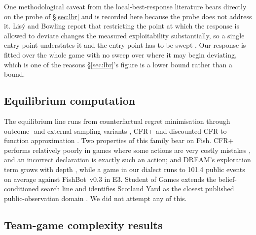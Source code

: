 \documentclass[11pt]{article}
\theoremstyle{definition}
\DeclareRobustCommand{\vthree}{\texorpdfstring{\mbox{FishBot v0.3}}{FishBot v0.3}}
\newcommand{\numEventsPerGame}{101.4}
\begin{document}
One methodological caveat from the local-best-response literature bears directly
on the probe of \S\ref{sec:lbr} and is recorded here because the probe does not
address it. Lis\'y and Bowling report that restricting the point at which the
response is allowed to deviate changes the measured exploitability substantially,
so a single entry point understates it and the entry point has to be swept
\cite{lisy-lbr}. Our response is fitted over the whole game with no sweep over
where it may begin deviating, which is one of the reasons \S\ref{sec:lbr}'s
figure is a lower bound rather than a bound.

\subsection{Equilibrium computation}

The equilibrium line runs from counterfactual regret minimisation
\cite{zinkevich-cfr} through outcome- and external-sampling variants
\cite{lanctot-mccfr}, CFR+ \cite{tammelin-cfrplus} and discounted CFR
\cite{brown-dcfr} to function approximation
\cite{brown-deepcfr,steinberger-dream}. Two properties of this family bear on
Fish. CFR+ performs relatively poorly in games where some actions are very
costly mistakes \cite{brown-dcfr}, and an incorrect declaration is exactly
such an action; and DREAM's exploration term grows with depth
\cite{steinberger-dream}, while a game in our dialect runs to
\numEventsPerGame{} public events on average against \vthree{} in E3. Student
of Games extends the belief-conditioned search line and identifies Scotland
Yard as the closest published public-observation domain \cite{schmid-sog}. We
did not attempt any of this.

\subsection{Team-game complexity results}
\end{document}
